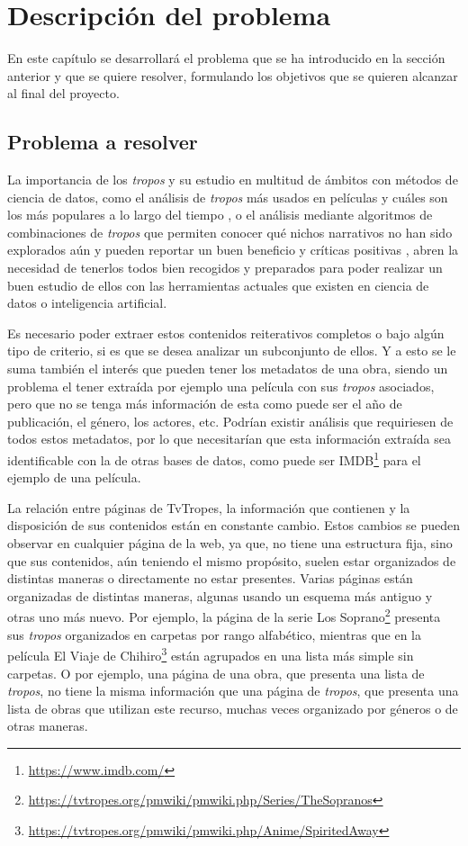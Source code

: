 \chapter{Descripción del problema}

En este capítulo se desarrollará el problema que se ha introducido en la sección
anterior y que se quiere resolver, formulando los objetivos que se quieren
alcanzar al final del proyecto.

\section{Problema a resolver}
La importancia de los \textit{tropos} y su estudio en multitud de ámbitos con
métodos de ciencia de datos, como el análisis de \textit{tropos} más usados en
películas y cuáles son los más populares a lo largo del tiempo
\cite{garcia2020tropes}, o el análisis mediante algoritmos de combinaciones de
\textit{tropos} que permiten conocer qué nichos narrativos no han sido
explorados aún y pueden reportar un buen beneficio y críticas positivas
\cite{garcia2021simpsons}, abren la necesidad de tenerlos todos bien recogidos y
preparados para poder realizar un buen estudio de ellos con las herramientas
actuales que existen en ciencia de datos o inteligencia artificial. 

Es necesario poder extraer estos contenidos reiterativos completos o bajo algún
tipo de criterio, si es que se desea analizar un subconjunto de ellos. Y a esto
se le suma también el interés que pueden tener los metadatos de una obra, siendo
un problema el tener extraída por ejemplo una película con sus \textit{tropos}
asociados, pero que no se tenga más información de esta como puede ser el año de
publicación, el género, los actores, etc. Podrían existir análisis que
requiriesen de todos estos metadatos, por lo que necesitarían que esta
información extraída sea identificable con la de otras bases de datos, como
puede ser IMDB\footnote{\url{https://www.imdb.com/}} para el ejemplo de una
película.

La relación entre páginas de TvTropes, la información que contienen y la
disposición de sus contenidos están en constante cambio. Estos cambios se pueden
observar en cualquier página de la web, ya que, no tiene una estructura fija,
sino que sus contenidos, aún teniendo el mismo propósito, suelen estar
organizados de distintas maneras o directamente no estar presentes. Varias
páginas están organizadas de distintas maneras, algunas usando un esquema más
antiguo y otras uno más nuevo. Por ejemplo, la página de la serie Los
Soprano\footnote{\url{https://tvtropes.org/pmwiki/pmwiki.php/Series/TheSopranos}}
presenta sus \textit{tropos} organizados en carpetas por rango alfabético,
mientras que  en la película El Viaje de
Chihiro\footnote{\url{https://tvtropes.org/pmwiki/pmwiki.php/Anime/SpiritedAway}}
están agrupados en una lista más simple sin carpetas. O por ejemplo, una página
de una obra, que presenta una lista de \textit{tropos}, no tiene la misma
información que una página de \textit{tropos}, que presenta una lista de obras
que utilizan este recurso, muchas veces organizado por géneros o de otras
maneras.

